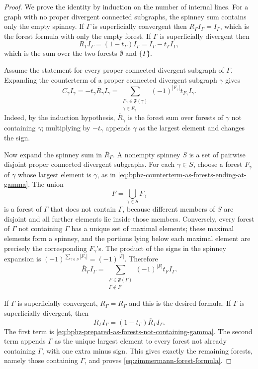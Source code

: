 \begin{proof}
We prove the identity by induction on the number of internal lines.  For a
graph with no proper divergent connected subgraphs, the spinney sum contains
only the empty spinney.  If \(\Gamma\) is superficially convergent then
\(R_\Gamma I_\Gamma=I_\Gamma\), which is the forest formula with only the
empty forest.  If \(\Gamma\) is superficially divergent then
\[
  R_\Gamma I_\Gamma=(1-t_\Gamma)I_\Gamma
  =
  I_\Gamma-t_\Gamma I_\Gamma ,
\]
which is the sum over the two forests
\(\emptyset\) and \(\{\Gamma\}\).

Assume the statement for every proper connected divergent subgraph of
\(\Gamma\).  Expanding the counterterm of a proper connected divergent
subgraph \(\gamma\) gives
\begin{equation}
  C_\gamma I_\gamma
  =
  -t_\gamma \overline R_\gamma I_\gamma
  =
  \sum_{\substack{F_\gamma\in\mathfrak F(\gamma)\\
                  \gamma\in F_\gamma}}
  (-1)^{|F_\gamma|}t_{F_\gamma}I_\gamma .
  \label{eq:bphz-counterterm-as-forests-ending-at-gamma}
\end{equation}
Indeed, by the induction hypothesis, \(\overline R_\gamma\) is the forest sum
over forests of \(\gamma\) not containing \(\gamma\); multiplying by
\(-t_\gamma\) appends \(\gamma\) as the largest element and changes the sign.

Now expand the spinney sum in \(\overline R_\Gamma\).  A nonempty spinney
\(S\) is a set of pairwise disjoint proper connected divergent subgraphs.
For each \(\gamma\in S\), choose a forest \(F_\gamma\) of \(\gamma\) whose
largest element is \(\gamma\), as in
\eqref{eq:bphz-counterterm-as-forests-ending-at-gamma}.  The union
\[
  F=\bigcup_{\gamma\in S}F_\gamma
\]
is a forest of \(\Gamma\) that does not contain \(\Gamma\), because different
members of \(S\) are disjoint and all further elements lie inside those
members.  Conversely, every forest of \(\Gamma\) not containing \(\Gamma\)
has a unique set of maximal elements; these maximal elements form a spinney,
and the portions lying below each maximal element are precisely the
corresponding \(F_\gamma\)'s.  The product of the signs in the spinney
expansion is
\((-1)^{\sum_{\gamma\in S}|F_\gamma|}=(-1)^{|F|}\).
Therefore
\begin{equation}
  \overline R_\Gamma I_\Gamma
  =
  \sum_{\substack{F\in\mathfrak F(\Gamma)\\\Gamma\notin F}}
  (-1)^{|F|}t_F I_\Gamma .
  \label{eq:bphz-prepared-as-forests-not-containing-gamma}
\end{equation}

If \(\Gamma\) is superficially convergent, \(R_\Gamma=\overline R_\Gamma\)
and this is the desired formula.  If \(\Gamma\) is superficially divergent,
then
\[
  R_\Gamma I_\Gamma
  =
  (1-t_\Gamma)\overline R_\Gamma I_\Gamma .
\]
The first term is
\eqref{eq:bphz-prepared-as-forests-not-containing-gamma}.  The second term
appends \(\Gamma\) as the unique largest element to every forest not already
containing \(\Gamma\), with one extra minus sign.  This gives exactly the
remaining forests, namely those containing \(\Gamma\), and proves
\eqref{eq:zimmermann-forest-formula}.
\end{proof}

